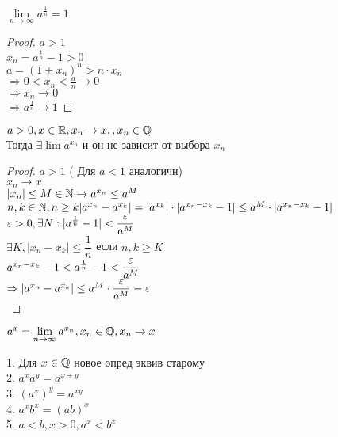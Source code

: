 \begin{definition}
\begin{lemma}
	$ \lim\limits_{n \rightarrow \infty} a^{\frac{1}{n}} = 1$
	\begin{proof}
		$ a > 1 $ \\
		$ x_n = a^{\frac{1}{n}} - 1 > 0 $ \\
		$ a = (1 + x_n)^n > n \cdot x_n $ \\
		$ \Rightarrow 0 < x_n < \frac{a}{n} \rightarrow 0 $  \\
		$ \Rightarrow x_n \rightarrow 0$ \\
		$ \Rightarrow a^{\frac{1}{n}} \rightarrow 1 $ 
	\end{proof}
\end{lemma}
\begin{theorem}
	$ a > 0, x \in \mathbb{R}, x_n \rightarrow x, , x_n \in \mathbb{Q} $ \\
	Тогда $ \exists \lim a^{x_n} $ и он не зависит от выбора $x_n$\\
	\begin{proof}
		$ a > 1$ ( Для $ a < 1 $ аналогичн) \\
		$ x_n \rightarrow x $ \\
		$ |x_n | \leq M \in \mathbb{N} \rightarrow a^{x_n} \leq a^M $ \\
		$ n, k \in \mathbb{N}, n \geq k | a^{x_n} - a^{x_k} | = |a^{x_k} | \cdot | a^{x_n - x_k} - 1 | \leq a^M \cdot | a^{x_n - x_k} - 1 | $ \\
		$ \varepsilon > 0, \exists N : |a^{\frac{1}{n}} - 1| < \dfrac{\varepsilon}{a^M} $ \\
		$ \exists K, |x_n - x_k | \leq \dfrac{1}{n} $ если $ n, k \geq K $ \\
		$ a^{x_n - x_k } - 1 < a^{\frac{1}{n}} - 1 < \dfrac{\varepsilon}{a^M} $ \\
		$ \Rightarrow |a^{x_n} - a^{x_k} | \leq a^M \cdot \dfrac{\varepsilon}{a^M} \equiv \varepsilon $ \\
	\end{proof}
\end{theorem}
\begin{definition}
$ a^x = \lim\limits_{n \rightarrow \infty} a^{x_n}, x_n \in \mathbb{Q}, x_n \rightarrow x $\\
\end{definition}
\begin{properties}
	1. Для $ x \in \mathbb{Q} $ новое опред эквив старому \\
	2. $ a^xa^y= a^{x+y} $\\
	3. $ (a^x)^y = a^{xy} $ \\
	4. $ a^x b^x = (ab)^x $ \\
	5. $ a < b, x > 0, a^x < b^x $ 
 	
\end{properties}




\end{definition}
